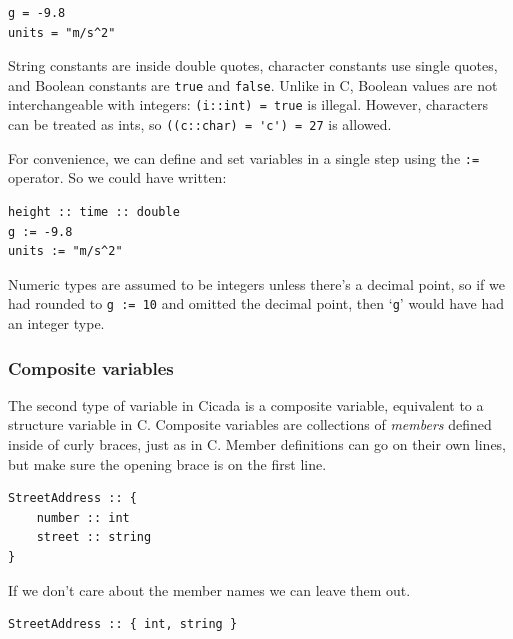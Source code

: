 \documentclass{article}
\newenvironment{code}{
       \begin{list}{}{
               \setlength{\leftmargin}{.4in}
               \setlength{\rightmargin}{0in}
               \setlength{\topsep}{.2in}
       }
       \small
       \item[] }
       { \end{list}   }
\begin{document}
\begin{code} \begin{verbatim}
g = -9.8
units = "m/s^2"
\end{verbatim} \end{code}

\noindent String constants are inside double quotes, character constants use single quotes, and Boolean constants are \verb#true# and \verb#false#.  Unlike in C, Boolean values are not interchangeable with integers:  \verb#(i::int) = true# is illegal.  However, characters can be treated as ints, so \verb#((c::char) = 'c') = 27# is allowed.

For convenience, we can define and set variables in a single step using the \verb#:=# operator.  So we could have written:

\begin{code} \begin{verbatim}
height :: time :: double
g := -9.8
units := "m/s^2"
\end{verbatim} \end{code}

\noindent Numeric types are assumed to be integers unless there's a decimal point, so if we had rounded to \verb#g := 10# and omitted the decimal point, then `\verb#g#' would have had an integer type.




\subsubsection{Composite variables}

  The second type of variable in Cicada is a composite variable, equivalent to a structure variable in C.  Composite variables are collections of \emph{members} defined inside of curly braces, just as in C.  Member definitions can go on their own lines, but make sure the opening brace is on the first line.

\begin{code} \begin{verbatim}
StreetAddress :: {
    number :: int
    street :: string
}
\end{verbatim} \end{code}

\noindent If we don't care about the member names we can leave them out.

\begin{code} \begin{verbatim}
StreetAddress :: { int, string }
\end{verbatim} \end{code}
\end{document}

